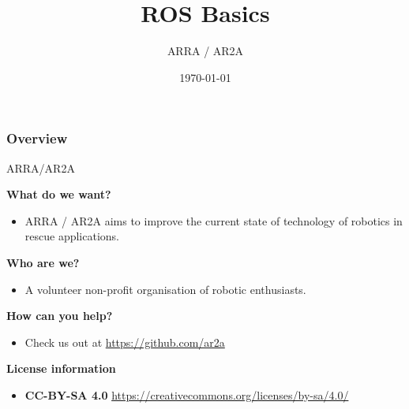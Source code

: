 \documentclass{beamer}
\title[]{ROS Basics} %
\author{ARRA / AR2A} %
\institute %
{
\textbf{A}dvancements for \textbf{R}obotics in \textbf{R}escue \textbf{A}pplications
}
\date{\today} %
\begin{document}
\begin{frame}
\titlepage %
\end{frame}
\begin{frame}
\frametitle{Overview} %
\tableofcontents %
\end{frame}
\begin{frame}{ARRA/AR2A}
\begin{large}\textbf{What do we want?}\end{large}
\begin{itemize}
 \item ARRA / AR2A aims to improve the current state of technology of robotics in rescue applications.
\end{itemize}
\begin{large}\textbf{Who are we?}\end{large}
\begin{itemize}
 \item A volunteer non-profit organisation of robotic enthusiasts.
\end{itemize}
\begin{large}\textbf{How can you help?}\end{large}
\begin{itemize}
 \item Check us out at \url{https://github.com/ar2a}
\end{itemize}
 \vspace{1cm}
\begin{large}\textbf{License information}\end{large}
\begin{itemize}
 \item \textbf{CC-BY-SA 4.0} \url{https://creativecommons.org/licenses/by-sa/4.0/}
\end{itemize}
\end{frame}
\end{document}
